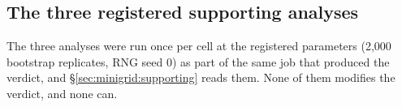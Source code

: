 \subsection{The three registered supporting analyses}
\label{app:minigrid:supporting}

The three analyses were run once per cell at the registered parameters
(2{,}000 bootstrap replicates, RNG seed 0) as part of the same job that produced
the verdict, and \S\ref{sec:minigrid:supporting} reads them. None of them
modifies the verdict, and none can.

